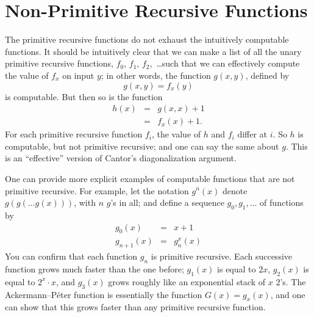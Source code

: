 \documentclass[10pt,a4paper]{article}
\theoremstyle{plain}
\theoremstyle{definition}
\theoremstyle{remark}
\newcommand*{\olfileid}[3]{}
\newcommand*{\olsection}[1]{\section*{#1}}
\begin{document}



\olfileid{cmp}{rec}{npr}
\olsection{Non-Primitive Recursive Functions}

The primitive recursive functions do not exhaust the intuitively
computable functions. It should be intuitively clear that we can make
a list of all the unary primitive recursive functions,
$f_0$, $f_1$, $f_2$,~\dots such that we can effectively compute the value of
$f_x$ on input $y$; in other words, the function $g(x,y)$, defined by
\[
g(x,y) = f_x(y)
\]
is computable. But then so is the function
\begin{eqnarray*}
h(x) & = & g(x,x) + 1 \\
& = & f_x(x) +1.
\end{eqnarray*}
For each primitive recursive function $f_i$, the value of $h$ and
$f_i$ differ at $i$. So $h$ is computable, but not primitive
recursive; and one can say the same about $g$. This is an
``effective'' version of Cantor's diagonalization argument.

One can provide more explicit examples of computable functions that
are not primitive recursive. For example, let the notation $g^n(x)$
denote $g(g(\dots g(x)))$, with $n$ $g$'s in all; and define a
sequence $g_0,g_1,\dots$ of functions by
\begin{eqnarray*}
g_0(x) & = & x+1 \\
g_{n + 1}(x) & = & g_n^x(x)
\end{eqnarray*}
You can confirm that each function $g_n$ is primitive recursive. Each
successive function grows much faster than the one before; $g_1(x)$ is
equal to $2x$, $g_2(x)$ is equal to $2^x \cdot x$, and $g_3(x)$ grows
roughly like an exponential stack of $x$ $2$'s. The Ackermann--P\'eter
function is essentially the function $G(x) = g_x(x)$, and one can show
that this grows faster than any primitive recursive function.
\end{document}
